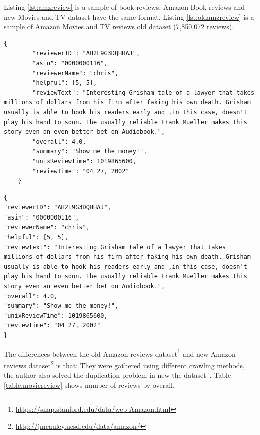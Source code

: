 Listing \ref{lst:amzreview} is a sample of book reviews.
Amazon Book reviews and new Movies and TV dataset have the same format. Listing \ref{lst:oldamzreview} is a sample of Amazon Movies and TV reviews old dataset (7,850,072 reviews).

\begin{lstlisting}[caption={Amazon reviews sample},label={lst:amzreview}]
    {
        "reviewerID": "AH2L9G3DQHHAJ",
        "asin": "0000000116",
        "reviewerName": "chris",
        "helpful": [5, 5],
        "reviewText": "Interesting Grisham tale of a lawyer that takes millions of dollars from his firm after faking his own death. Grisham usually is able to hook his readers early and ,in this case, doesn't play his hand to soon. The usually reliable Frank Mueller makes this story even an even better bet on Audiobook.",
        "overall": 4.0,
        "summary": "Show me the money!",
        "unixReviewTime": 1019865600,
        "reviewTime": "04 27, 2002"
    }
\end{lstlisting}

\begin{lstlisting}[caption={Old Amazon reviews sample},label={lst:oldamzreview}]
{
"reviewerID": "AH2L9G3DQHHAJ",
"asin": "0000000116",
"reviewerName": "chris",
"helpful": [5, 5],
"reviewText": "Interesting Grisham tale of a lawyer that takes millions of dollars from his firm after faking his own death. Grisham usually is able to hook his readers early and ,in this case, doesn't play his hand to soon. The usually reliable Frank Mueller makes this story even an even better bet on Audiobook.",
"overall": 4.0,
"summary": "Show me the money!",
"unixReviewTime": 1019865600,
"reviewTime": "04 27, 2002"
}
\end{lstlisting}

The differences between the old Amazon reviews dataset\footnote{\url{https://snap.stanford.edu/data/web-Amazon.html}} and new Amazon reviews dataset\footnote{\url{http://jmcauley.ucsd.edu/data/amazon/}} is that:
They were gathered using different crawling methods, the author also solved the duplication problem in new the dataset~\cite{amazon-reviews}.
Table \ref{table:moviereview} shows number of reviews by overall.

